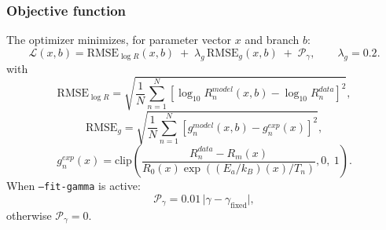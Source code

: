\documentclass[11pt]{article}
\begin{document}
\subsubsection*{Objective function}
The optimizer minimizes, for parameter vector \(x\) and branch \(b\):
\begin{equation}
\mathcal{L}(x,b)
=
\mathrm{RMSE}_{\log R}(x,b)
\;+\;
\lambda_g\,\mathrm{RMSE}_{g}(x,b)
\;+\;
\mathcal{P}_\gamma,
\qquad
\lambda_g=0.2.
\label{eq:fit_objective}
\end{equation}
with
\begin{equation}
\mathrm{RMSE}_{\log R}
=
\sqrt{\frac{1}{N}\sum_{n=1}^{N}
\left[
\log_{10}R_n^{model}(x,b)-\log_{10}R_n^{data}
\right]^2},
\label{eq:fit_rmse_r}
\end{equation}
\begin{equation}
\mathrm{RMSE}_{g}
=
\sqrt{\frac{1}{N}\sum_{n=1}^{N}
\left[g_n^{model}(x,b)-g_n^{exp}(x)\right]^2},
\label{eq:fit_rmse_g}
\end{equation}
\begin{equation}
g_n^{exp}(x)
=
\mathrm{clip}\!\left(
\frac{R_n^{data}-R_m(x)}
{R_0(x)\exp((E_a/k_B)(x)/T_n)},
0,\ 1
\right).
\label{eq:fit_g_exp}
\end{equation}
When \texttt{--fit-gamma} is active:
\[
\mathcal{P}_\gamma=0.01\,\lvert \gamma-\gamma_{\mathrm{fixed}}\rvert,
\]
otherwise \(\mathcal{P}_\gamma=0\).
\end{document}
